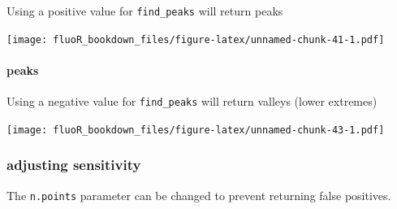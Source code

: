 \documentclass[
]{book}
\newenvironment{Shaded}{\begin{snugshade}}{\end{snugshade}}
\newcommand{\CommentTok}[1]{\textcolor[rgb]{0.56,0.35,0.01}{\textit{#1}}}
\newcommand{\DataTypeTok}[1]{\textcolor[rgb]{0.13,0.29,0.53}{#1}}
\newcommand{\DecValTok}[1]{\textcolor[rgb]{0.00,0.00,0.81}{#1}}
\newcommand{\KeywordTok}[1]{\textcolor[rgb]{0.13,0.29,0.53}{\textbf{#1}}}
\newcommand{\NormalTok}[1]{#1}
\newcommand{\OperatorTok}[1]{\textcolor[rgb]{0.81,0.36,0.00}{\textbf{#1}}}
\newcommand{\StringTok}[1]{\textcolor[rgb]{0.31,0.60,0.02}{#1}}
\begin{document}
Using a positive value for \texttt{find\_peaks} will return peaks

\begin{Shaded}
\end{Shaded}

\texttt{[image: fluoR\_bookdown\_files/figure-latex/unnamed-chunk-41-1.pdf]}

\hypertarget{analysis-metrics-peaks-find-valleys}{%
\paragraph{peaks}\label{analysis-metrics-peaks-find-valleys}}

Using a negative value for \texttt{find\_peaks} will return valleys (lower extremes)

\begin{Shaded}
\end{Shaded}

\texttt{[image: fluoR\_bookdown\_files/figure-latex/unnamed-chunk-43-1.pdf]}

\hypertarget{analysis-metrics-peaks-sensitivity}{%
\subsubsection{adjusting sensitivity}\label{analysis-metrics-peaks-sensitivity}}

The \texttt{n.points} parameter can be changed to prevent returning false positives.

\begin{Shaded}
\end{Shaded}
\end{document}
